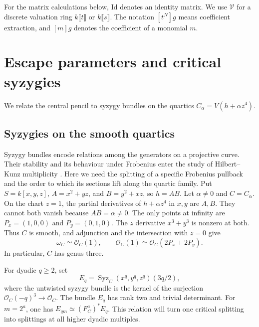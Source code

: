 \documentclass[11pt,a4paper,reqno]{amsart}
\numberwithin{equation}{section}
\theoremstyle{plain}
\theoremstyle{definition}
\theoremstyle{remark}
\newcommand{\Id}{\mathrm{Id}}
\DeclareMathOperator{\Syz}{Syz}
\begin{document}
For the matrix calculations below, $\Id$ denotes an identity matrix.
We use $\mathcal V$ for a discrete valuation ring $k\llbracket t\rrbracket$
or $k\llbracket s\rrbracket$. The notation $[t^N]g$ means coefficient
extraction, and $[m]g$ denotes the coefficient of a monomial $m$.

\section{Escape parameters and critical syzygies}\label{sec:escape}
We relate the central pencil to syzygy bundles on the quartics
$C_\alpha=V(h+\alpha z^4)$. 

\subsection{Syzygies on the smooth quartics}\label{subsec:quartic-syzygies}
Syzygy bundles encode relations among the generators on a projective
curve. Their stability and its behaviour under Frobenius enter the
study of Hilbert--Kunz multiplicity \cite{BrennerStable,Trivedi}.
Here we need the splitting of a specific Frobenius pullback and the
order to which its sections lift along the quartic family.
Put $S=k[x,y,z]$, $A=x^2+yz$, and $B=y^2+xz$, so $h=AB$.
Let $\alpha\ne0$ and $C=C_\alpha$. On the chart $z=1$, the partial
derivatives of $h+\alpha z^4$ in $x,y$ are $A,B$.
They cannot both vanish because $AB=\alpha\ne0$.
The only points at infinity are $P_x=(1,0,0)$ and $P_y=(0,1,0)$.
The $z$ derivative $x^3+y^3$ is nonzero at both. Thus $C$ is smooth,
and adjunction and the intersection with $z=0$ give
\begin{equation}\label{eq:quartic-canonical}
\omega_C\simeq\mathcal O_C(1),\qquad
\mathcal O_C(1)\simeq\mathcal O_C(2P_x+2P_y).
\end{equation}
In particular, $C$ has genus three.

For dyadic $q\geq2$, set
\[
E_q=\Syz_C(x^q,y^q,z^q)(3q/2),
\]
where the untwisted syzygy bundle is the kernel of the surjection
$\mathcal O_C(-q)^3\to\mathcal O_C$.
The bundle $E_q$ has rank two and trivial determinant.
For $m=2^a$, one has $E_{qm}\simeq(F_C^a)^*E_q$.
This relation will turn one critical splitting into splittings at all
higher dyadic multiples.
\end{document}
